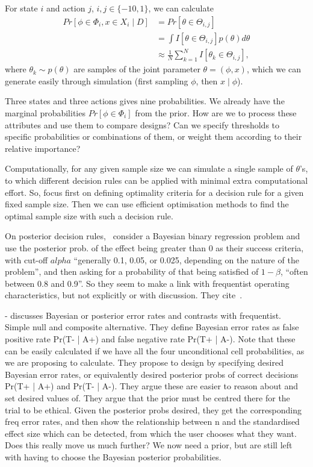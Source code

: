 \documentclass{article} %
\begin{document}
For state $i$ and action $j$, $i,j \in \{-1 0, 1\}$, we can calculate
\begin{align}
Pr[\phi \in \Phi_{i}, x \in X_{i} \mid D]  &= Pr[\theta \in \Theta_{i,j}] \\
&= \int I[\theta \in \Theta_{i,j}] p(\theta) d\theta \\
& \approx \frac{1}{N} \sum_{k=1}^{N} I[\theta_{k} \in \Theta_{i,j}],
\end{align}
where $\theta_{k} \sim p(\theta)$ are samples of the joint parameter $\theta = (\phi, x)$, which we can generate easily through simulation (first sampling $\phi$, then $x \mid \phi$).

Three states and three actions gives nine probabilities. We already have the marginal probabilities $Pr[\phi \in \Phi_{i}]$ from the prior. How are we to process these attributes and use them to compare designs? Can we specify thresholds to specific probabilities or combinations of them, or weight them according to their relative importance?

Computationally, for any given sample size we can simulate a single sample of $\theta$'s, to which different decision rules can be applied with minimal extra computational effort. So, focus first on defining optimality criteria for a decision rule for a given fixed sample size. Then we can use efficient optimisation methods to find the optimal sample size with such a decision rule.

On posterior decision rules,~\cite{Beavers2012} consider a Bayesian binary regression problem and use the posterior prob. of the effect being greater than 0 as their success criteria, with cut-off $alpha$ ``generally 0.1, 0.05, or 0.025, depending on the nature of the problem'', and then asking for a probability of that being satisfied of $1-\beta$,  ``often between 0.8 and 0.9''. So they seem to make a link with frequentist operating characteristics, but not explicitly or with discussion. They cite~\cite{Brutti2008}.

\cite{Lee2000} - discusses Bayesian or posterior error rates and contrasts with frequentist. Simple null and composite alternative. They define Bayesian error rates as false positive rate Pr(T- | A+) and false negative rate Pr(T+ | A-). Note that these can be easily calculated if we have all the four unconditional cell probabilities, as we are proposing to calculate. They propose to design by specifying desired Bayesian error rates, or equivalently desired posterior probs of correct decisions Pr(T+ | A+) and Pr(T- | A-). They argue these are easier to reason about and set desired values of. They argue that the prior must be centred there for the trial to be ethical. Given the posterior probs desired, they get the corresponding freq error rates, and then show the relationship between n and the standardised effect size which can be detected, from which the user chooses what they want. Does this really move us much further? We now need a prior, but are still left with having to choose the Bayesian posterior probabilities.
\end{document}
